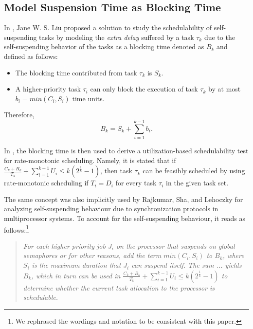 \documentclass[10pt,conference,preprint]{IEEEtran}
\begin{document}
\subsection{Model Suspension Time as Blocking Time}

In \cite[Pages 164-165]{Liu:2000:RS:518501}, Jane W. S. Liu proposed a solution to study the schedulability of self-suspending tasks by modeling the \emph{extra delay} suffered by a task $\tau_k$ due to the self-suspending behavior of the tasks as a blocking time denoted as $B_k$ and defined as follows:
\begin{itemize}
\item The blocking time contributed from task $\tau_k$ is $S_k$.
\item A higher-priority task $\tau_i$ can only block the execution of task $\tau_k$ by at most $b_i=min(C_i, S_i)$ time units.
\end{itemize}
Therefore, 
\begin{equation}
\label{eq:Bk}
B_k = S_k + \sum_{i=1}^{k-1} b_i.
\end{equation}

In \cite{Liu:2000:RS:518501}, the blocking time is then used to derive a utilization-based schedulability test for rate-monotonic scheduling. Namely, it is stated that if $\frac{C_k+B_k}{T_k} + \sum_{i=1}^{k-1} U_i \leq k (2^{\frac{1}{k}}-1)$, then task $\tau_k$ can be feasibly scheduled by using rate-monotonic scheduling if $T_i=D_i$ for every task $\tau_i$ in the given task set. 
  

The same concept was also implicitly used by Rajkumar, Sha, and Lehoczky \cite[Page 267]{DBLP:conf/rtss/RajkumarSL88} for analyzing self-suspending behaviour due to synchronization protocols in multiprocessor systems. To account for the self-suspending behaviour, it reads as follows:\footnote{We rephrased the wordings and notation to be consistent with this paper.}
\begin{quote}
\emph{For each higher priority job $J_i$ on the processor that suspends on global semaphores or for other reasons, add the term $min(C_i, S_i)$ to $B_k$, where $S_i$ is the maximum duration that $J_i$ can suspend itself. The sum ... yields $B_k$, which in turn can be used in 
$\frac{C_k+B_k}{T_k} + \sum_{i=1}^{k-1} U_i \leq k (2^{\frac{1}{k}}-1)$ to determine whether the current task allocation to the processor is schedulable.}
\end{quote}
  
\end{document}
